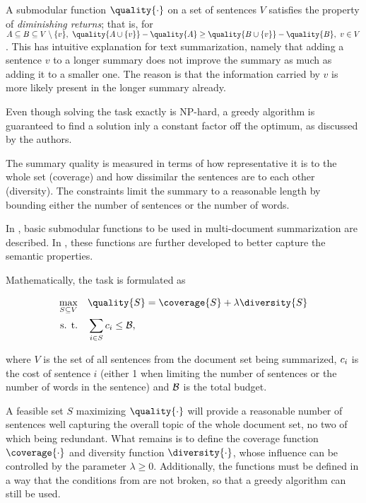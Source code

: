 A submodular function $\quality{\cdot}$ on a set of sentences $V$ satisfies the property of \textit{diminishing returns}; that is, for $A \subseteq B \subseteq V \setminus \{ v \},\ \quality{A \cup \{ v \}} - \quality{A} \geq \quality{B \cup \{ v \}} - \quality{B},\ v \in V$. This has intuitive explanation for text summarization, namely that adding a sentence $v$ to a longer summary does not improve the summary as much as adding it to a smaller one. The reason is that the information carried by $v$ is more likely present in the longer summary already.

Even though solving the task exactly is NP-hard, a greedy algorithm is guaranteed to find a solution inly a constant factor off the optimum, as discussed by the authors.

The summary quality is measured in terms of how representative it is to the whole set (coverage) and how dissimilar the sentences are to each other (diversity). The constraints limit the summary to a reasonable length by bounding either the number of sentences or the number of words.

In \cite{multi-summarization-1}, basic submodular functions to be used in multi-document summarization are described. In \cite{multi-summarization-2}, these functions are further developed to better capture the semantic properties.

Mathematically, the task is formulated as

\begin{equation}
\begin{alignedat}{-1}
\max_{S \subseteq V} & \quad \quality{S} = \coverage{S} + \lambda \diversity{S} \\
\text{s. t.} & \quad \sum_{i \in S}{\sentcost_{i}} \leq \budget,
\end{alignedat}
\end{equation}

where $V$ is the set of all sentences from the document set being summarized, $c_{i}$ is the cost of sentence $i$ (either 1 when limiting the number of sentences or the number of words in the sentence) and $\mathcal{B}$ is the total budget.

A feasible set $S$ maximizing $\quality{\cdot}$ will provide a reasonable number of sentences well capturing the overall topic of the whole document set, no two of which being redundant. What remains is to define the coverage function $\coverage{\cdot}$ and diversity function $\diversity{\cdot}$, whose influence can be controlled by the parameter $\lambda \geq 0$. Additionally, the functions must be defined in a way that the conditions from \cite{multi-summarization-1} are not broken, so that a greedy algorithm can still be used.


